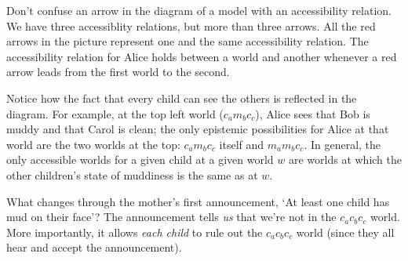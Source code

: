 Don't confuse an arrow in the diagram of a model with an accessibility relation.
We have three accessiblity relations, but more than three arrows. All the red
arrows in the picture represent one and the same accessibility relation. The
accessibility relation for Alice holds between a world and another whenever a
red arrow leads from the first world to the second.

Notice how the fact that every child can see the others is reflected in the
diagram. For example, at the top left world ($c_am_bc_c$), Alice sees that Bob
is muddy and that Carol is clean; the only epistemic possibilities for Alice at
that world are the two worlds at the top: $c_am_bc_c$ itself and $m_am_bc_c$. In
general, the only accessible worlds for a given child at a given world $w$ are
worlds at which the other children's state of muddiness is the same as at $w$.

What changes through the mother's first announcement, `At least one child has
mud on their face'? The announcement tells \emph{us} that we're not in the
$c_ac_bc_c$ world. More importantly, it allows \emph{each child} to rule out the
$c_ac_bc_c$ world (since they all hear and accept the announcement).

\begin{center}
\end{center}

